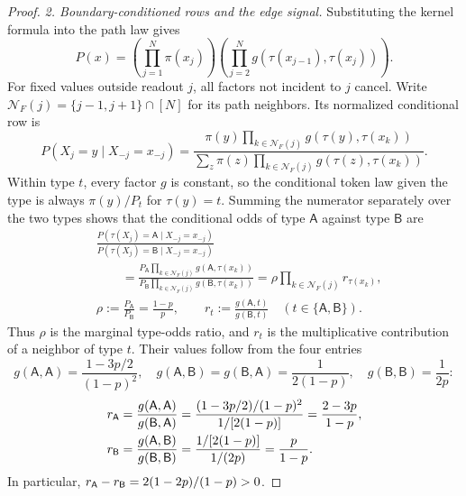 \begin{proof}
\emph{2. Boundary-conditioned rows and the edge signal.}
Substituting the kernel formula into the path law gives
\[
 P(x)=\left(\prod_{j=1}^N\pi(x_j)\right)
      \left(\prod_{j=2}^Ng(\tau(x_{j-1}),\tau(x_j))\right).
\]
For fixed values outside readout $j$, all factors not incident to $j$
cancel.  Write $\mathcal N_F(j)=\{j-1,j+1\}\cap[N]$ for its path
neighbors.  Its normalized conditional row is
\[
 P(X_j=y\mid X_{-j}=x_{-j})
 =\frac{\pi(y)\prod_{k\in\mathcal N_F(j)}
                   g(\tau(y),\tau(x_k))}
        {\sum_z\pi(z)\prod_{k\in\mathcal N_F(j)}
                   g(\tau(z),\tau(x_k))}.
\]
Within type $t$, every factor $g$ is constant, so the conditional token
law given the type is always $\pi(y)/P_t$ for $\tau(y)=t$.
Summing the numerator separately over the two types shows that the
conditional odds of type $\mathsf A$ against type $\mathsf B$ are
\begin{align*}
 &\frac{P(\tau(X_j)=\mathsf A\mid X_{-j}=x_{-j})}
        {P(\tau(X_j)=\mathsf B\mid X_{-j}=x_{-j})}\\
 &\qquad=
 \frac{P_{\mathsf A}\prod_{k\in\mathcal N_F(j)}g(\mathsf A,\tau(x_k))}
      {P_{\mathsf B}\prod_{k\in\mathcal N_F(j)}g(\mathsf B,\tau(x_k))}
 =\rho\prod_{k\in\mathcal N_F(j)}r_{\tau(x_k)},\\
 &\rho:=\frac{P_{\mathsf A}}{P_{\mathsf B}}=\frac{1-p}{p},
 \qquad r_t:=\frac{g(\mathsf A,t)}{g(\mathsf B,t)}
 \quad(t\in\{\mathsf A,\mathsf B\}).
\end{align*}
Thus $\rho$ is the marginal type-odds ratio, and $r_t$ is the
multiplicative contribution of a neighbor of type $t$.
Their values follow from the four entries
\[
 g(\mathsf A,\mathsf A)=\frac{1-3p/2}{(1-p)^2},\quad
 g(\mathsf A,\mathsf B)=g(\mathsf B,\mathsf A)=\frac1{2(1-p)},\quad
 g(\mathsf B,\mathsf B)=\frac1{2p}:
\]
\begin{align*}
 r_{\mathsf A}&=
 \frac{g(\mathsf A,\mathsf A)}{g(\mathsf B,\mathsf A)}
 =
 \frac{(1-3p/2)/(1-p)^2}{1/[2(1-p)]}
 =\frac{2-3p}{1-p},\\
 r_{\mathsf B}&=
 \frac{g(\mathsf A,\mathsf B)}{g(\mathsf B,\mathsf B)}
 =
 \frac{1/[2(1-p)]}{1/(2p)}
 =\frac{p}{1-p}.
\end{align*}
In particular, $r_{\mathsf A}-r_{\mathsf B}=2(1-2p)/(1-p)>0$.


\end{proof}
